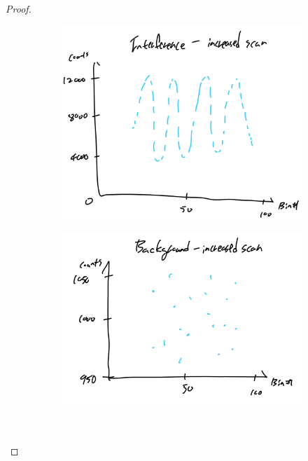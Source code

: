 \documentclass{article}
\numberwithin{equation}{section}
\begin{document}
\begin{proof}
    
    \begin{figure}[htp]
        \centering
        \begin{subfigure}[b]{0.45\textwidth}
            \includegraphics[width=\textwidth]{B_spread.png}
            \label{fig:fig1}
        \end{subfigure}
        \hfill
        \begin{subfigure}[b]{0.45\textwidth}
            \includegraphics[width=\textwidth]{B_bg_spread.png}
            \label{fig:fig2}
        \end{subfigure}
        \
        \begin{subfigure}[b]{0.45\textwidth}

\end{subfigure}
\end{figure}
\end{proof}
\end{document}
